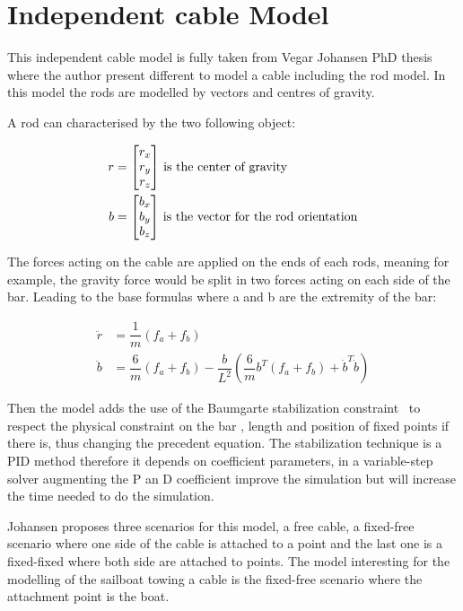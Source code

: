 \section{Independent cable Model}

This independent cable model is fully taken from  Vegar Johansen PhD thesis~\cite{johansen2007modelling} where the author present different to model a cable including the rod model. In this model the rods are modelled by vectors and centres of gravity.

A rod can characterised by the two following object:

\begin{align}
r &= \begin{bmatrix}
    r_x \\
    r_y \\
    r_z
\end{bmatrix}\, \textnormal{is the center of gravity}\\
b &= \begin{bmatrix}
    b_x \\
    b_y \\
    b_z
\end{bmatrix}\, \textnormal{is the vector for the rod orientation}
\end{align}

The forces acting on the cable are applied on the ends of each rods, meaning for example, the gravity force would be split in two forces acting on each side of the bar. Leading to the base formulas where a and b are the extremity of the bar:

\begin{align}
\ddot{r} &= \dfrac{1}{m}  (f_a+f_b) \\
\ddot{b} &=  \dfrac{6}{m}(f_a+f_b) - \dfrac{b}{L^{2}}  (\dfrac{6}{m}b^{T}(f_a+f_b)+\dot{b}^{T}\dot{b}) 
\end{align}

Then the model adds the use of the Baumgarte stabilization constraint~\cite{baumgarte1972stabilization} to respect the physical constraint on the bar , length and position of fixed points if there is, thus changing the precedent equation. 
The stabilization technique is a PID method therefore it depends on coefficient parameters, in a variable-step solver augmenting the P an D coefficient improve the simulation but will increase the time needed to do the simulation.

Johansen proposes three scenarios for this model, a free cable, a fixed-free scenario where one side of the cable is attached to a point and the last one is a fixed-fixed where both side are attached to points.
The model interesting for the modelling of the sailboat towing a cable is the fixed-free scenario where the attachment point is the boat.


